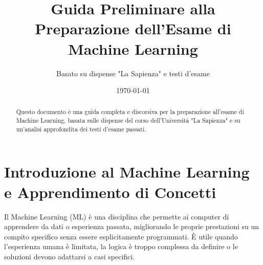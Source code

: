 \documentclass[a4paper,11pt]{article}
\title{Guida Preliminare alla Preparazione dell'Esame di Machine Learning}
\author{Basato su dispense "La Sapienza" e testi d'esame}
\date{\today}
\begin{document}
\maketitle

\begin{abstract}
Questo documento è una guida completa e discorsiva per la preparazione all'esame di Machine Learning, basata sulle dispense del corso dell'Università "La Sapienza" 
e su un'analisi approfondita dei testi d'esame passati. 
\end{abstract}

\tableofcontents
\newpage

\section{Introduzione al Machine Learning e Apprendimento di Concetti}

Il Machine Learning (ML) è una disciplina che permette ai computer di apprendere da dati o esperienza passata, migliorando le proprie prestazioni su un compito specifico senza essere esplicitamente programmati. È utile quando l'esperienza umana è limitata, la logica è troppo complessa da definire o le soluzioni devono adattarsi a casi specifici.
\end{document}
